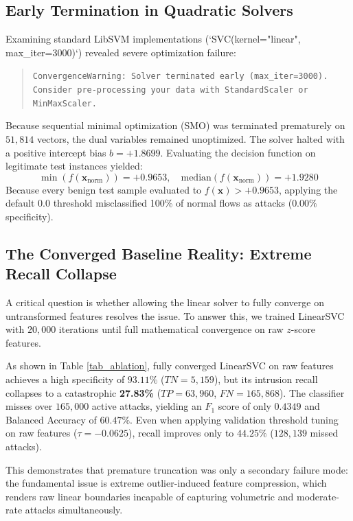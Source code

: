 \documentclass[conference]{IEEEtran}
\begin{document}
\subsection{Early Termination in Quadratic Solvers}
Examining standard LibSVM implementations (`SVC(kernel="linear", max_iter=3000)`) revealed severe optimization failure:
\begin{quote}
\texttt{ConvergenceWarning: Solver terminated early (max\_iter=3000). Consider pre-processing your data with StandardScaler or MinMaxScaler.}
\end{quote}
Because sequential minimal optimization (SMO) was terminated prematurely on $51,814$ vectors, the dual variables remained unoptimized. The solver halted with a positive intercept bias $b = +1.8699$. Evaluating the decision function on legitimate test instances yielded:
\begin{equation}
\min(f(\mathbf{x}_{\text{norm}})) = +0.9653, \quad \text{median}(f(\mathbf{x}_{\text{norm}})) = +1.9280
\end{equation}
Because every benign test sample evaluated to $f(\mathbf{x}) > +0.9653$, applying the default $0.0$ threshold misclassified 100\% of normal flows as attacks ($0.00\%$ specificity).

\subsection{The Converged Baseline Reality: Extreme Recall Collapse}
A critical question is whether allowing the linear solver to fully converge on untransformed features resolves the issue. To answer this, we trained LinearSVC with $20,000$ iterations until full mathematical convergence on raw $z$-score features.

As shown in Table \ref{tab_ablation}, fully converged LinearSVC on raw features achieves a high specificity of $93.11\%$ ($TN = 5,159$), but its intrusion recall collapses to a catastrophic \textbf{27.83\%} ($TP = 63,960$, $FN = 165,868$). The classifier misses over $165,000$ active attacks, yielding an $F_1$ score of only $0.4349$ and Balanced Accuracy of $60.47\%$. Even when applying validation threshold tuning on raw features ($\tau = -0.0625$), recall improves only to $44.25\%$ ($128,139$ missed attacks).

This demonstrates that premature truncation was only a secondary failure mode: the fundamental issue is extreme outlier-induced feature compression, which renders raw linear boundaries incapable of capturing volumetric and moderate-rate attacks simultaneously.
\end{document}
